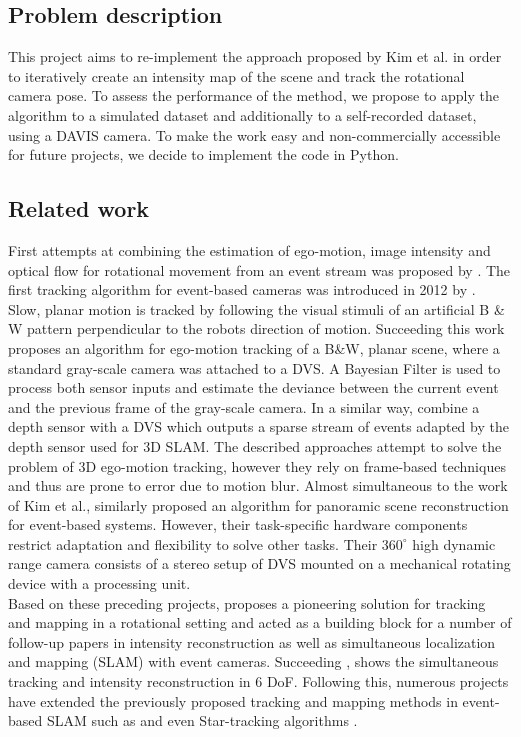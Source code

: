 \documentclass[10pt,twocolumn,letterpaper]{article}
\begin{document}
\subsection{Problem description}
This project aims to re-implement the approach proposed by Kim et al. \cite{kim2014simultaneous} in order to  iteratively create an intensity map of the scene and track the rotational camera pose.
To assess the performance of the method, we propose to apply the algorithm to a simulated dataset and additionally to a self-recorded dataset, using a DAVIS camera. To make the work easy and non-commercially accessible for future projects, we decide to implement the code in Python.


\subsection{Related work}

First attempts at combining the estimation of ego-motion, image intensity and optical flow for rotational movement from an event stream was proposed by \cite{cook}. The first tracking algorithm for event-based cameras was introduced in 2012 by \cite{weikensdorfer}. 
Slow, planar motion is tracked by following the visual stimuli of an artificial B \& W pattern perpendicular to the robots direction of motion. Succeeding this work \cite{mitrgbd} proposes an algorithm for ego-motion tracking of a B&W, planar scene, where a standard gray-scale camera was attached to a DVS. 
A Bayesian Filter is used to process both sensor inputs and estimate the deviance between the current event and the previous frame of the gray-scale camera. 
In a similar way, \cite{weikensdorfer2} combine a depth sensor with a DVS which outputs a sparse stream of events adapted by the depth sensor used for 3D SLAM. The described approaches attempt to solve the problem of 3D ego-motion tracking, however they rely on frame-based techniques and thus are prone to error due to motion blur. Almost simultaneous to the work of Kim et al., \cite{austria} similarly proposed an algorithm for panoramic scene reconstruction for event-based systems. However, their task-specific hardware components restrict adaptation and flexibility to solve other tasks. Their $360^\circ $ high dynamic range camera consists of a stereo setup of DVS mounted on a mechanical rotating device with a processing unit. \\

Based on these preceding projects, \cite{kim2014simultaneous} proposes a pioneering solution for tracking and mapping in a rotational setting and acted as a building block for a number of follow-up papers in intensity reconstruction as well as simultaneous localization and mapping (SLAM) with event cameras. Succeeding \cite{kim2014simultaneous}, \cite{reinbacher} shows the simultaneous tracking and intensity reconstruction in 6 DoF. Following this, numerous projects have extended the previously proposed tracking and mapping methods in event-based SLAM such as \cite{paperpresentation} and even Star-tracking algorithms \cite{startracking}.
\end{document}
